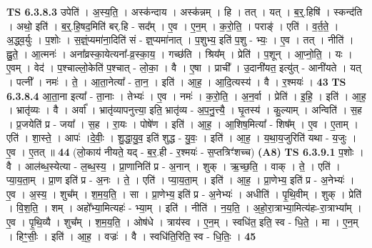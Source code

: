 \documentclass[17pt]{extarticle}
\begin{document}
                  \newline
                                \textbf{ TS 6.3.8.3} \newline
                  उपेति॑ । अ॒स्य॒ति॒ । अस्क॑न्दाय । अस्क॑न्नम् । हि । तत् । यत् । ब॒र्॒.हिषि॑ । स्कन्द॑ति । अथो॒ इति॑ । ब॒र्॒.हि॒षद॒मिति॑ बर्.हि - सद᳚म् । ए॒व । ए॒न॒म् । क॒रो॒ति॒ । पराङ्॑ । एति॑ । व॒र्त॒ते॒ । अ॒द्ध्व॒र्युः । प॒शोः । स॒ज्ञ्ं॒प्यमा॑ना॒दिति॑ सं - ज्ञ्॒प्यमा॑नात् । प॒शुभ्य॒ इति॑ प॒शु - भ्यः॒ । ए॒व । तत् । नीति॑ । ह्नु॒ते॒ । आ॒त्मनः॑ । अना᳚व्रस्का॒येत्यना᳚-व्र॒स्का॒य॒ । गच्छ॑ति । श्रिय᳚म् । प्रेति॑ । प॒शून् । आ॒प्नो॒ति॒ । यः । ए॒वम् । वेद॑ । प॒श्चाल्लो॒केति॑ प॒श्चात् - लो॒का॒ । वै । ए॒षा । प्राची᳚ । उ॒दानी॑यत॒ इत्यु॑त् - आनी॑यते । यत् । पत्नी᳚ । नमः॑ । ते॒ । आ॒ता॒नेत्या᳚ - ता॒न॒ । इति॑ । आ॒ह॒ । आ॒दि॒त्यस्य॑ । वै । र॒श्मयः॑ । \textbf{  43} \newline
                  \newline
                                \textbf{ TS 6.3.8.4} \newline
                  आ॒ता॒ना इत्या᳚ - ता॒नाः । तेभ्यः॑ । ए॒व । नमः॑ । क॒रो॒ति॒ । अ॒न॒र्वा । प्रेति॑ । इ॒हि॒ । इति॑ । आ॒ह॒ । भ्रातृ॑व्यः । वै । अर्वा᳚ । भ्रातृ॑व्यापनुत्त्या॒ इति॒ भ्रातृ॑व्य - अ॒प॒नु॒त्त्यै॒ । घृ॒तस्य॑ । कु॒ल्याम् । अन्विति॑ । स॒ह । प्र॒जयेति॑ प्र - जया᳚ । स॒ह । रा॒यः । पोषे॑ण । इति॑ । आ॒ह॒ । आ॒शिष॒मित्या᳚ - शिष᳚म् । ए॒व । ए॒ताम् । एति॑ । शा॒स्ते॒ । आपः॑ ।दे॒वीः॒ । शु॒द्धा॒यु॒व॒ इति॑ शुद्ध - यु॒वः॒ । इति॑ । आ॒ह॒ । य॒था॒य॒जुरिति॑ यथा - य॒जुः । ए॒व । ए॒तत् ॥ \textbf{  44 } \newline
                  \newline
                      (लो॒काय॑ नीयते॒ यद् - ब॒र॒.ही - र॒श्मयः॑ - स॒प्तत्रिꣳ॑शच्च)  \textbf{(A8)} \newline \newline
                                \textbf{ TS 6.3.9.1} \newline
                  प॒शोः । वै । आल॑ब्ध॒स्येत्या - ल॒ब्ध॒स्य॒ । प्रा॒णानिति॑ प्र - अ॒नान् । शुक् । ऋ॒च्छ॒ति॒ । वाक् । ते॒ । एति॑ । प्या॒य॒ता॒म् । प्रा॒ण इति॑ प्र - अ॒नः । ते॒ । एति॑ । प्या॒य॒ता॒म् । इति॑ । आ॒ह॒ । प्रा॒णेभ्य॒ इति॑ प्र - अ॒नेभ्यः॑ । ए॒व । अ॒स्य॒ । शुच᳚म् । श॒म॒य॒ति॒ । सा । प्रा॒णेभ्य॒ इति॑ प्र - अ॒नेभ्यः॑ । अधीति॑ । पृ॒थि॒वीम् । शुक् । प्रेति॑ । वि॒श॒ति॒ । शम् । अहो᳚भ्या॒मित्यहः॑ - भ्या॒म् । इति॑ । नीति॑ । न॒य॒ति॒ । अ॒हो॒रा॒त्राभ्या॒मित्य॑हः-रा॒त्राभ्या᳚म् । ए॒व । पृ॒थि॒व्यै । शुच᳚म् । श॒म॒य॒ति॒ । ओष॑धे । त्राय॑स्व । ए॒न॒म् । स्वधि॑त॒ इति॒ स्व - धि॒ते॒ । मा । ए॒न॒म् । हिꣳ॒॒सीः॒ । इति॑ । आ॒ह॒ । वज्रः॑ । वै । स्वधि॑ति॒रिति॒ स्व - धि॒तिः॒ । \textbf{  45 } \newline
\end{document}
